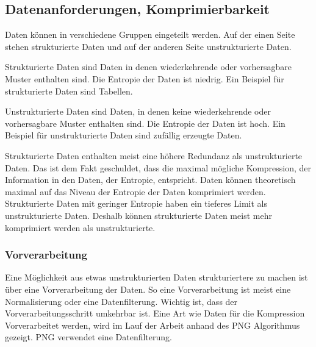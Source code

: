 \documentclass[conference]{IEEEtran}
\begin{document}

\subsection{Datenanforderungen, Komprimierbarkeit}

Daten können in verschiedene Gruppen eingeteilt werden.
Auf der einen Seite stehen strukturierte Daten und auf der anderen Seite
unstrukturierte Daten.

Strukturierte Daten sind Daten in denen wiederkehrende oder vorhersagbare Muster 
enthalten sind. 
Die Entropie der Daten ist niedrig.
Ein Beispiel für strukturierte Daten sind Tabellen. 

Unstrukturierte Daten sind Daten, in denen keine wiederkehrende oder vorhersagbare 
Muster enthalten sind.
Die Entropie der Daten ist hoch.
Ein Beispiel für unstrukturierte Daten sind zufällig erzeugte Daten.

Strukturierte Daten enthalten meist eine höhere Redundanz als unstrukturierte 
Daten. 
Das ist dem Fakt geschuldet, dass die maximal mögliche Kompression, der Information in den 
Daten, der Entropie, entspricht. 
Daten können theoretisch maximal auf das Niveau der Entropie der Daten komprimiert werden.
Strukturierte Daten mit geringer Entropie haben ein tieferes Limit als unstrukturierte Daten.
Deshalb können strukturierte Daten meist mehr komprimiert werden als unstrukturierte.

\subsubsection{Vorverarbeitung}

Eine Möglichkeit aus etwas unstrukturierten Daten strukturiertere zu machen ist über 
eine Vorverarbeitung der Daten.
So eine Vorverarbeitung ist meist eine Normalisierung oder eine Datenfilterung.
Wichtig ist, dass der Vorverarbeitungsschritt umkehrbar ist.
Eine Art wie Daten für die Kompression Vorverarbeitet werden, wird im Lauf der 
Arbeit anhand des PNG Algorithmus gezeigt. 
PNG verwendet eine Datenfilterung.
\end{document}
